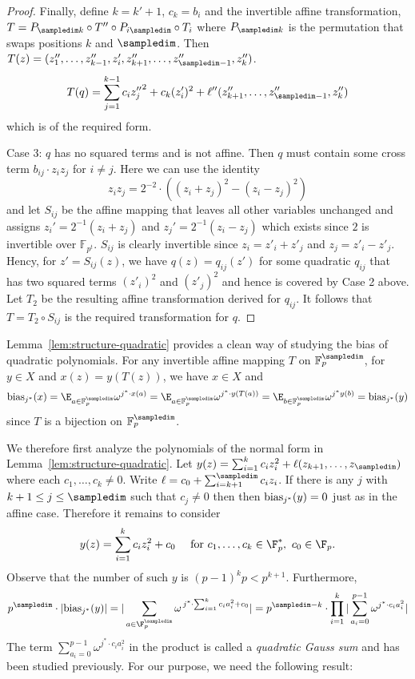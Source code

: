 \begin{proof}
\begin{sloppypar}
Finally, define $k=k'+1$, $c_k=b_i$ and
the invertible affine transformation,
$T=P_{\sampledim k}\circ T'' \circ P_{i\sampledim}\circ T_i$ where
$P_{\sampledim k}$ is the permutation that swaps positions $k$ and $\sampledim$.  
Then $T(z)=(z''_1,\ldots,z''_{k-1},z'_i,z''_{k+1},\ldots,z''_{\sampledim-1},z''_{k})$.
$$T(q)=\sum_{j=1}^{k-1} c_i{z_{j}''}^2+c_k(z_i')^2+\ell''(z''_{k+1},\ldots,z''_{\sampledim-1},z''_k)$$
which is of the required form.
\end{sloppypar}

{\sc Case 3:} $q$ has no squared terms and is not affine.
Then $q$ must contain some cross term $b_{ij}\cdot z_iz_j$ for $i\ne j$.
Here we can use the identity
\[
z_iz_j=2^{-2}\cdot ((z_i+z_j)^2-(z_i-z_j)^2)
\]
and let $S_{ij}$ be the affine mapping that leaves all other variables unchanged
and assigns $z_i'=2^{-1}(z_i+z_j)$ and
$z_j'=2^{-1}(z_i-z_j)$ which exists since $2$ is invertible over $\mathbb{F}_{p^t}$.
$S_{ij}$ is clearly invertible since $z_i=z'_i+z'_j$ and $z_j=z'_i-z'_j$.
Hency, for $z'=S_{ij}(z)$, we have $q(z)=q_{ij}(z')$ for some quadratic
$q_{ij}$ that
has two squared terms $(z'_i)^2$ and $(z'_j)^2$ and hence is covered by Case 2
above.
Let $T_2$ be the resulting affine transformation derived for $q_{ij}$.
It follows that $T=T_2\circ S_{ij}$ is the required transformation for $q$.
\end{proof}

Lemma~\ref{lem:structure-quadratic} provides a clean way of studying the bias
of quadratic polynomials.
For any invertible affine mapping $T$ on $\mathbb{F}_p^\sampledim$, for $y\in X$
and $x(z)=y(T(z))$, we have $x\in X$ and
\begin{align*}
\biasjs(x)=\E_{a\in \mathbb{F}_p^{\sampledim}} \omega^{j^*\cdot x(a)}=\E_{a\in \mathbb{F}_p^{\sampledim}} \omega^{j^*\cdot y(T(a))}=\E_{b\in \mathbb{F}_p^\sampledim}\omega^{j^* y(b)}=\biasjs(y)
\end{align*}
since $T$ is a bijection on $\mathbb{F}_p^\sampledim$.

We therefore first analyze the polynomials of the normal form in
Lemma~\ref{lem:structure-quadratic}.
Let $y(z)=\sum_{i=1}^k c_iz_i^2+\ell(z_{k+1},\ldots, z_{\sampledim})$ where
each $c_1,\ldots,c_k \ne 0$.
Write $\ell=c_0+\sum_{i=k+1}^\sampledim c_iz_i$.
If there is any $j$ with $k+1\le j\le \sampledim$ such that $c_j\ne 0$ then
then $\mathrm{bias}_{j^*}(y)=0$ just as in the affine case.
Therefore it remains to consider 
\begin{equation}
y(z)=\sum_{i=1}^k c_iz_i^2+c_0\quad\mbox{ for }c_1,\ldots,c_k\in \F_p^*,\ c_0\in \F_p. \label{y-form}
\end{equation}
Observe that the number of such $y$ is $(p-1)^k p< p^{k+1}$.
Furthermore,
\begin{equation*}
p^\sampledim\cdot |\biasjs(y)|=|\sum_{a\in \F_p^\sampledim}\omega^{\,j^*\cdot \sum_{i=1}^k c_ia_i^2+c_0}|
=p^{\sampledim-k}\cdot\prod_{i=1}^k|\sum_{a_i=0}^{p-1}\omega^{j^*\cdot c_ia_i^2}|
\end{equation*}
The term $\sum_{a_i=0}^{p-1}\omega^{j^*\cdot c_ia_i^2}$ in the product
is called a \emph{quadratic Gauss sum} and has been studied previously.
For our purpose, we need the following result:

